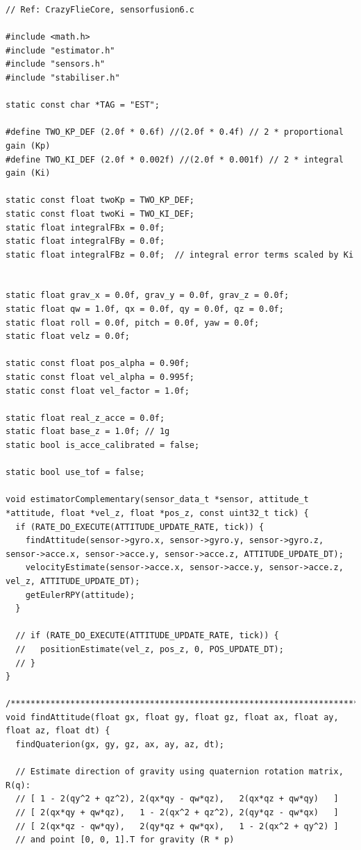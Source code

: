 \begin{lstlisting}[caption={estimator.c}]
// Ref: CrazyFlieCore, sensorfusion6.c 

#include <math.h>
#include "estimator.h"
#include "sensors.h"
#include "stabiliser.h"

static const char *TAG = "EST";

#define TWO_KP_DEF (2.0f * 0.6f) //(2.0f * 0.4f) // 2 * proportional gain (Kp)
#define TWO_KI_DEF (2.0f * 0.002f) //(2.0f * 0.001f) // 2 * integral gain (Ki)

static const float twoKp = TWO_KP_DEF;    
static const float twoKi = TWO_KI_DEF;    
static float integralFBx = 0.0f;
static float integralFBy = 0.0f;
static float integralFBz = 0.0f;  // integral error terms scaled by Ki


static float grav_x = 0.0f, grav_y = 0.0f, grav_z = 0.0f;
static float qw = 1.0f, qx = 0.0f, qy = 0.0f, qz = 0.0f; 
static float roll = 0.0f, pitch = 0.0f, yaw = 0.0f;
static float velz = 0.0f;

static const float pos_alpha = 0.90f;
static const float vel_alpha = 0.995f;
static const float vel_factor = 1.0f;

static float real_z_acce = 0.0f;
static float base_z = 1.0f; // 1g 
static bool is_acce_calibrated = false;

static bool use_tof = false;

void estimatorComplementary(sensor_data_t *sensor, attitude_t *attitude, float *vel_z, float *pos_z, const uint32_t tick) {
  if (RATE_DO_EXECUTE(ATTITUDE_UPDATE_RATE, tick)) {
    findAttitude(sensor->gyro.x, sensor->gyro.y, sensor->gyro.z, sensor->acce.x, sensor->acce.y, sensor->acce.z, ATTITUDE_UPDATE_DT);
    velocityEstimate(sensor->acce.x, sensor->acce.y, sensor->acce.z, vel_z, ATTITUDE_UPDATE_DT);
    getEulerRPY(attitude); 
  }

  // if (RATE_DO_EXECUTE(ATTITUDE_UPDATE_RATE, tick)) {
  //   positionEstimate(vel_z, pos_z, 0, POS_UPDATE_DT);
  // }
}

/**********************************************************************/
void findAttitude(float gx, float gy, float gz, float ax, float ay, float az, float dt) {
  findQuaterion(gx, gy, gz, ax, ay, az, dt);
  
  // Estimate direction of gravity using quaternion rotation matrix, R(q):
  // [ 1 - 2(qy^2 + qz^2), 2(qx*qy - qw*qz),   2(qx*qz + qw*qy)   ]
  // [ 2(qx*qy + qw*qz),   1 - 2(qx^2 + qz^2), 2(qy*qz - qw*qx)   ]
  // [ 2(qx*qz - qw*qy),   2(qy*qz + qw*qx),   1 - 2(qx^2 + qy^2) ]
  // and point [0, 0, 1].T for gravity (R * p) 
  

\end{lstlisting}
